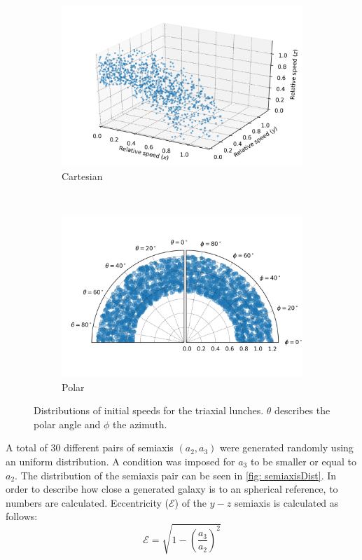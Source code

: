	\begin{figure}[h]
		\centering
		\begin{subfigure}[b]{0.49\textwidth}
			\includegraphics[width = \textwidth]{"../Files/Week 13/3d_initial_speeds"}
			\caption{Cartesian}
		\end{subfigure}
		~ 
		\begin{subfigure}[b]{0.49\textwidth}
			\includegraphics[width=\textwidth]{"../Files/Week 13/polar_initial_speeds"}
			\caption{Polar}
		\end{subfigure}
		\caption{Distributions of initial speeds for the triaxial lunches. $\theta$ describes the polar angle and $\phi$ the azimuth.}
		\label{fig: initialSpeedDistributions}
	\end{figure}

	A total of 30 different pairs of semiaxis $(a_2, a_3)$ were generated randomly using an uniform distribution. A condition was imposed for $a_3$ to be smaller or equal to $a_2$. The distribution of the semiaxis pair can be seen in \autoref{fig: semiaxisDist}. In order to describe how close a generated galaxy is to an spherical reference, to numbers are calculated. Eccentricity ($\mathcal{E}$) of the $y-z$ semiaxis is calculated as follows:
	\begin{equation}
		\mathcal{E} = \sqrt{1 - \left(\dfrac{a_3}{a_2}\right)^2}
	\end{equation}
	
